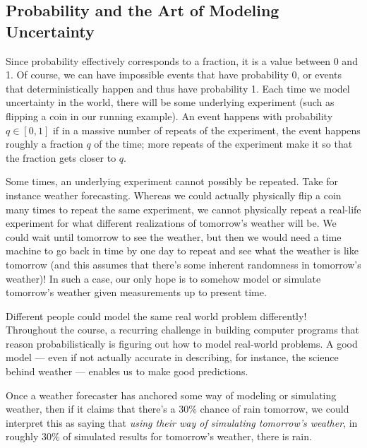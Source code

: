 \documentclass[6008notes.tex]{subfiles}
\begin{document}
\subsection{Probability and the Art of Modeling Uncertainty}
Since probability effectively corresponds to a fraction, it is a value between 0 and 1. Of course, we can have impossible events that have probability 0, or events that deterministically happen and thus have probability 1. Each time we model uncertainty in the world, there will be some underlying experiment (such as flipping a coin in our running example). An event happens with probability $q \in [0,1]$ if in a massive number of repeats of the experiment, the event happens roughly a fraction $q$ of the time; more repeats of the experiment make it so that the fraction gets closer to $q$.

Some times, an underlying experiment cannot possibly be repeated. Take for instance weather forecasting. Whereas we could actually physically flip a coin many times to repeat the same experiment, we cannot physically repeat a real-life experiment for what different realizations of tomorrow's weather will be. We could wait until tomorrow to see the weather, but then we would need a time machine to go back in time by one day to repeat and see what the weather is like tomorrow (and this assumes that there's some inherent randomness in tomorrow's weather)! In such a case, our only hope is to somehow model or simulate tomorrow's weather given measurements up to present time.

Different people could model the same real world problem differently! Throughout the course, a recurring challenge in building computer programs that reason probabilistically is figuring out how to model real-world problems. A good model --- even if not actually accurate in describing, for instance, the science behind weather --- enables us to make good predictions.

Once a weather forecaster has anchored some way of modeling or simulating weather, then if it claims that there's a 30\% chance of rain tomorrow, we could interpret this as saying that \textit{using their way of simulating tomorrow's weather}, in roughly 30\% of simulated results for tomorrow's weather, there is rain.
\end{document}
